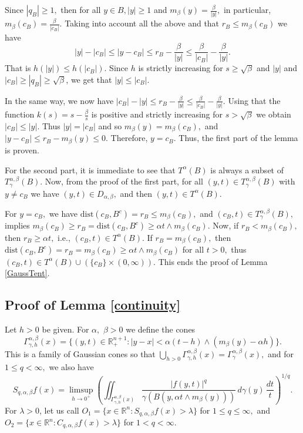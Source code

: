 \documentclass[leqno,11pt]{amsart}
\theoremstyle{plain}
\theoremstyle{remark}
\begin{document}
{Since $|q_B|\ge 1,$ then for all $y\in B, |y|\ge 1$ and $m_\beta (y)=\frac{\beta}{|y|},$ in particular, 
$m_\beta (c_B)=\frac{\beta}{|c_B|}.$ Taking into account all the above and that $r_B \le m_\beta (c_B) $ we have
$$|y|-|c_B|\le |y-c_B|\le r_B-\frac{\beta}{|y|}\le \frac{\beta}{|c_B|}-\frac{\beta}{|y|}.$$ That is $h(|y|)\le h(|c_B|).$ Since $h$ is strictly increasing for $ s\ge \sqrt{\beta}$ and $|y|$ and $|c_B| \ge |q_B| \ge \sqrt{\beta}$, we get that $|y|\le |c_B|.$  

In the same way, we now have $|c_B|-|y|\le r_B-\frac{\beta}{|y|}\le \frac{\beta}{|c_B|}-\frac{\beta}{|y|}$. Using that the function $k(s)=s-\frac{\beta}{s}$ is positive and strictly increasing for $s>\sqrt{\beta}$ we obtain $|c_B|\le |y|.$ Thus $|y|=|c_B|$ and so $m_\beta (y)=m_\beta (c_B),$ and $|y-c_B|\le r_B - m_\beta (y)\le 0.$ Therefore, $y=c_B.$
Thus, the first part of the lemma is proven.


For the second part, it is immediate to see that $T^\alpha (B)$ is always a subset of $T_\gamma^{\alpha, \beta}(B).$
Now, from the proof of the first part,
for all $(y,t)\in T^{\alpha, \beta}_\gamma (B)$ with $y\ne c_B$ we have $(y,t)\in D_{\alpha, \beta},$ and then $(y,t)\in T^\alpha (B).$

For $y=c_B,$ we have $\text{dist}(c_B,B^c)=r_B\le m_\beta(c_B),$ and $(c_B,t)\in T_\gamma^{\alpha, \beta}(B),$ implies $m_\beta (c_B)\ge r_B =\text{dist}(c_B,B^c)\ge \alpha t\wedge m_\beta(c_B).$ Now, if $r_B<m_\beta(c_B),$ then $r_B\ge \alpha t,$ i.e., $(c_B,t)\in T^\alpha(B).$ If $r_B=m_\beta(c_B),$ then $\text{dist}(c_B,B^c)=r_B=m_\beta(c_B)\ge \alpha t\wedge m_\beta (c_B)$ for all $t>0,$ thus $(c_B,t)\in T^\alpha(B)\cup (\{c_B\}\times (0,\infty)).$  This ends the proof of Lemma \ref{GaussTent}.

 

{{ 
\subsection{Proof of Lemma \ref{continuity}}\label{falta}

Let $h>0$ be given. For $\alpha,$ $\beta>0$ we define the cones
\begin{equation*}
\Gamma_{\gamma, h}^{\alpha,\beta}(x)=\{(y,t)\in\mathbb{R}^{n+1}_+: |y-x|<\alpha(t-h)\wedge (m_\beta(y)-\alpha h)\}.
\end{equation*}
This is a family of Gaussian cones so that $\bigcup_{h>0}\Gamma_{\gamma, h}^{\alpha,\beta}(x)=\Gamma_{\gamma}^{\alpha, \beta}(x),$ and for $1\le q<\infty,$ we also have
\begin{equation}\label{limite}
S_{q,\alpha,\beta}f(x)=\limsup_{h\to 0^+}\left(\iint_{\Gamma_{\gamma, h}^{\alpha, \beta}(x)}\frac{|f(y,t)|^q}{\gamma(B(y,\alpha t\wedge m_\beta (y)))}\, d\gamma(y)\, \frac{dt}{t}\right)^{1/q}.
\end{equation}
For $\lambda>0$, let us call $O_1=\{x\in \mathbb{R}^n: S_{q,\alpha,\beta}f(x)>\lambda\}$ for $1\le q\le \infty,$ and $O_2=\{x\in \mathbb{R}^n: C_{q,\alpha, \beta} f(x)>\lambda\}$ for $1<q<\infty.$

}}}
\end{document}
